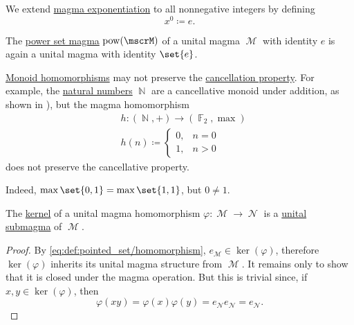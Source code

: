 \begin{definition}
\begin{thmenum}
     We extend \hyperref[def:magma/exponentiation]{magma exponentiation} to all nonnegative integers by defining
    \begin{equation*}
      x^0 \coloneqq e.
    \end{equation*}

     The \hyperref[def:magma/power_set]{power set magma} \( \pow(\mscrM) \) of a unital magma \( \mscrM \) with identity \( e \) is again a unital magma with identity \( \set{ e } \).
  \end{thmenum}
\end{definition}

\begin{example}\label{ex:monoid_cancellation_not_preserved_by_homomorphism}
  \hyperref[def:unital_magma/homomorphism]{Monoid homomorphisms} may not preserve the \hyperref[def:magma/cancellative]{cancellation property}. For example, the \hyperref[def:set_of_natural_numbers]{natural numbers} \( \BbbN \) are a cancellative monoid under addition, as shown in ), but the magma homomorphism
  \begin{equation*}
    \begin{aligned}
      &h: (\BbbN, +) \to (\hyperref[thm:galois_field_existence]{\BbbF_2}, \max) \\
      &h(n) \coloneqq \begin{cases}
        0, &n = 0 \\
        1, &n > 0
      \end{cases}
    \end{aligned}
  \end{equation*}
  does not preserve the cancellative property.

  Indeed, \( \max\set{ 0, 1} = \max\set{ 1, 1 } \), but \( 0 \neq 1 \).
\end{example}

\begin{proposition}\label{thm:unital_magma_kernel_is_submagma}
  The \hyperref[def:pointed_set_kernel]{kernel} of a unital magma homomorphism \( \varphi: \mscrM \to \mscrN \) is a \hyperref[def:first_order_substructure]{unital submagma} of \( \mscrM \).
\end{proposition}
\begin{proof}
  By \eqref{eq:def:pointed_set/homomorphism}, \( e_{\mscrM} \in \ker(\varphi) \), therefore \( \ker(\varphi) \) inherits its unital magma structure from \( \mscrM \). It remains only to show that it is closed under the magma operation. But this is trivial since, if \( x, y \in \ker(\varphi) \), then
  \begin{equation*}
    \varphi(xy) = \varphi(x) \varphi(y) = e_{\mscrN} e_{\mscrN} = e_{\mscrN}.
  \end{equation*}
\end{proof}
